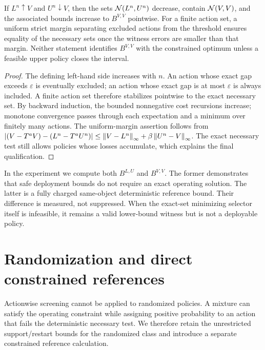 \begin{proposition}\label{prop:nested}
If $L^n\uparrow V$ and $U^n\downarrow V$, then the sets $\mathcal N(L^n,U^n)$ decrease, contain $\mathcal N(V,V)$, and the associated bounds increase to $B^{V,V}$ pointwise. For a finite action set, a uniform strict margin separating excluded actions from the threshold ensures equality of the necessary sets once the witness errors are smaller than that margin. Neither statement identifies $B^{V,V}$ with the constrained optimum unless a feasible upper policy closes the interval.
\end{proposition}
\begin{proof}
The defining left-hand side increases with $n$. An action whose exact gap exceeds $\varepsilon$ is eventually excluded; an action whose exact gap is at most $\varepsilon$ is always included. A finite action set therefore stabilizes pointwise to the exact necessary set. By backward induction, the bounded nonnegative cost recursions increase; monotone convergence passes through each expectation and a minimum over finitely many actions. The uniform-margin assertion follows from $|(V-T^aV)-(L^n-T^aU^n)|\leq\left\|V-L^n\right\|_\infty+\beta\left\|U^n-V\right\|_\infty$. The exact necessary test still allows policies whose losses accumulate, which explains the final qualification.\end{proof}

In the experiment we compute both $B^{L,U}$ and $B^{V,V}$. The former demonstrates that safe deployment bounds do not require an exact operating solution. The latter is a fully charged same-object deterministic reference bound. Their difference is measured, not suppressed. When the exact-set minimizing selector itself is infeasible, it remains a valid lower-bound witness but is not a deployable policy.

\section{Randomization and direct constrained references}\label{sec:frontier}
Actionwise screening cannot be applied to randomized policies. A mixture can satisfy the operating constraint while assigning positive probability to an action that fails the deterministic necessary test. We therefore retain the unrestricted support/restart bounds for the randomized class and introduce a separate constrained reference calculation.

